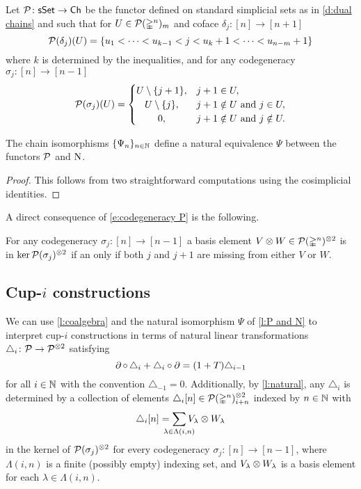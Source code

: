 \begin{definition}
	Let $\mathcal{P} \colon \mathsf{sSet} \to \mathsf{Ch}$ be the functor defined on standard simplicial sets as in \cref{d:dual chains} and such that for $U \in \mathcal{P}(\mathbb{\Delta}^n)_m$ and coface $\delta_j \colon [n] \to [n+1]$
	\[
	\mathcal{P}(\delta_j)(U) = \{ u_1 < \dots < u_{k-1} < j < u_k+1 < \dots < u_{n-m}+1 \}
	\]
	where $k$ is determined by the inequalities, and for any codegeneracy $\sigma_j \colon [n] \to [n-1]$
	\begin{equation}\label{e:codegeneracy P}
	\cP(\sigma_j)(U) = \begin{cases}
	U \setminus \{j+1\}, & j+1 \in U, \\
	\hfil U \setminus \{j\}, & j+1 \notin U \text{ and } j \in U, \\
	\hfil 0, & j+1 \notin U \text{ and } j \notin U.
	\end{cases}
	\end{equation}
\end{definition}

\begin{lemma}\label{l:P and N}
	The chain isomorphisms $\{\Psi_n\}_{n \in \mathbb{N}}$ define a natural equivalence $\Psi$ between the functors $\mathcal{P}$ and $\operatorname{N}$.
\end{lemma}

\begin{proof}
	This follows from two straightforward computations using the cosimplicial identities.
\end{proof}

A direct consequence of \cref{e:codegeneracy P} is the following.

\begin{lemma}\label{l:kernel of sxs}
	For any codegeneracy $\sigma_j \colon [n] \to [n-1]$ a basis element $V \otimes W \in \mathcal{P}(\mathbb{\Delta}^n)^{\otimes 2}$ is in $\ker \mathcal{P}(\sigma_j)^{\otimes 2}$ if an only if both $j$ and $j+1$ are missing from either $V$ or $W$.
\end{lemma}

\subsection{Cup-$i$ constructions}

We can use \cref{l:coalgebra} and the natural isomorphism $\Psi$ of \cref{l:P and N} to interpret \mbox{cup-$i$} constructions in terms of natural linear transformations $\triangle_i \colon \mathcal{P} \to \mathcal{P}^{\otimes 2}$ satisfying
\[
\operatorname{\partial} \circ \, \triangle_i + \triangle_i \circ \operatorname{\partial} =
(1+T) \triangle_{i-1}
\]
for all $i \in \mathbb{N}$ with the convention $\triangle_{-1} = 0$.
Additionally, by \cref{l:natural}, any $\triangle_i$ is determined by a collection of elements $\triangle_i [n] \in \mathcal{P}(\mathbb{\Delta}^n)^{\otimes 2}_{i+n} $ indexed by $n \in \mathbb{N}$ with
\[
\triangle_i [n] =
\sum_{\mathclap{\lambda \in \Lambda(i,n)}} V_\lambda \ot W_\lambda
\]
in the kernel of $\mathcal{P}(\sigma_j)^{\otimes 2}$ for every codegeneracy $\sigma_j \colon [n] \to [n-1]$,
where $\Lambda(i,n)$ is a finite (possibly empty) indexing set, and $V_\lambda \otimes W_\lambda$ is a basis element for each $\lambda \in \Lambda(i,n)$.

